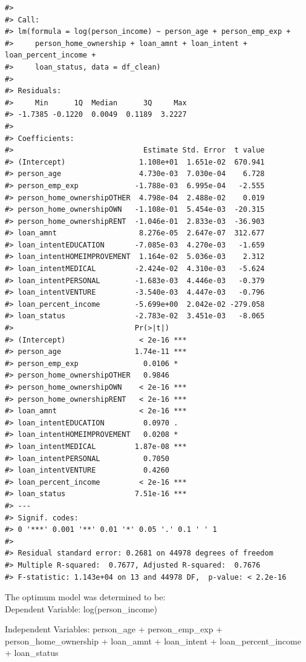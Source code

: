 \documentclass[
  10pt,
]{article}
\begin{document}
\begin{verbatim}
#> 
#> Call:
#> lm(formula = log(person_income) ~ person_age + person_emp_exp + 
#>     person_home_ownership + loan_amnt + loan_intent + loan_percent_income + 
#>     loan_status, data = df_clean)
#> 
#> Residuals:
#>     Min      1Q  Median      3Q     Max 
#> -1.7385 -0.1220  0.0049  0.1189  3.2227 
#> 
#> Coefficients:
#>                              Estimate Std. Error  t value
#> (Intercept)                 1.108e+01  1.651e-02  670.941
#> person_age                  4.730e-03  7.030e-04    6.728
#> person_emp_exp             -1.788e-03  6.995e-04   -2.555
#> person_home_ownershipOTHER  4.798e-04  2.488e-02    0.019
#> person_home_ownershipOWN   -1.108e-01  5.454e-03  -20.315
#> person_home_ownershipRENT  -1.046e-01  2.833e-03  -36.903
#> loan_amnt                   8.276e-05  2.647e-07  312.677
#> loan_intentEDUCATION       -7.085e-03  4.270e-03   -1.659
#> loan_intentHOMEIMPROVEMENT  1.164e-02  5.036e-03    2.312
#> loan_intentMEDICAL         -2.424e-02  4.310e-03   -5.624
#> loan_intentPERSONAL        -1.683e-03  4.446e-03   -0.379
#> loan_intentVENTURE         -3.540e-03  4.447e-03   -0.796
#> loan_percent_income        -5.699e+00  2.042e-02 -279.058
#> loan_status                -2.783e-02  3.451e-03   -8.065
#>                            Pr(>|t|)    
#> (Intercept)                 < 2e-16 ***
#> person_age                 1.74e-11 ***
#> person_emp_exp               0.0106 *  
#> person_home_ownershipOTHER   0.9846    
#> person_home_ownershipOWN    < 2e-16 ***
#> person_home_ownershipRENT   < 2e-16 ***
#> loan_amnt                   < 2e-16 ***
#> loan_intentEDUCATION         0.0970 .  
#> loan_intentHOMEIMPROVEMENT   0.0208 *  
#> loan_intentMEDICAL         1.87e-08 ***
#> loan_intentPERSONAL          0.7050    
#> loan_intentVENTURE           0.4260    
#> loan_percent_income         < 2e-16 ***
#> loan_status                7.51e-16 ***
#> ---
#> Signif. codes:  
#> 0 '***' 0.001 '**' 0.01 '*' 0.05 '.' 0.1 ' ' 1
#> 
#> Residual standard error: 0.2681 on 44978 degrees of freedom
#> Multiple R-squared:  0.7677, Adjusted R-squared:  0.7676 
#> F-statistic: 1.143e+04 on 13 and 44978 DF,  p-value: < 2.2e-16
\end{verbatim}

The optimum model was determined to be:\\

Dependent Variable: log(person\_income)~

Independent Variables: person\_age + person\_emp\_exp +
person\_home\_ownership + loan\_amnt + loan\_intent +
loan\_percent\_income + loan\_status\\
\end{document}
